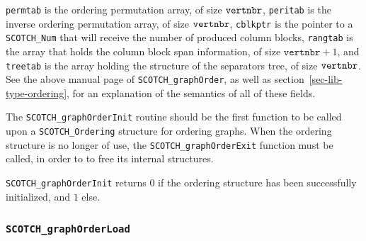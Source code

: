 \begin{itemize}
{\tt permtab} is the ordering permutation array, of size ${\tt
vertnbr}$, {\tt peritab} is the inverse ordering permutation array,
of size ${\tt vertnbr}$, {\tt cblkptr} is the pointer to a
{\tt SCOTCH\_\lbt Num} that will receive the number of produced
column blocks, {\tt rangtab} is the array that holds the column block
span information, of size $\mathtt{vertnbr} + 1$, and {\tt treetab}
is the array holding the structure of the separators tree, of size
${\tt vertnbr}$. See the above manual page of
{\tt SCOTCH\_graph\lbt Order}, as well as
section~\ref{sec-lib-type-ordering}, for an explanation of the
semantics of all of these fields.

The {\tt SCOTCH\_\lbt graph\lbt Order\lbt Init} routine should be the
first function to be called upon a {\tt SCOTCH\_\lbt Ordering}
structure for ordering graphs. When the ordering structure is no
longer of use, the {\tt SCOTCH\_\lbt graph\lbt Order\lbt Exit}
function must be called, in order to to free its internal structures.

\progret

{\tt SCOTCH\_graphOrderInit} returns $0$ if the ordering structure has
been successfully initialized, and $1$ else.
\end{itemize}

\subsubsection{{\tt SCOTCH\_graphOrderLoad}}

